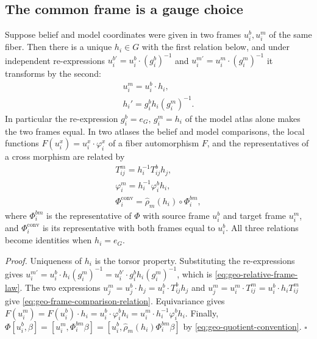 \subsection{The common frame is a gauge choice}
\label{sec:geo-diagonal}

Suppose belief and model coordinates were given in two frames $u_i^b,u_i^m$ of the same fiber. Then
there is a unique $h_i\in G$ with the first relation below, and under independent re-expressions
$u_i^{b\prime}=u_i^b\cdot(g_i^b)^{-1}$ and $u_i^{m\prime}=u_i^m\cdot(g_i^m)^{-1}$ it transforms by the
second:
\begin{gather}
u_i^m=u_i^b\cdot h_i,
\label{eq:geo-relative-frame}\\
h_i'=g_i^bh_i(g_i^m)^{-1}.
\label{eq:geo-relative-frame-law}
\end{gather}
In particular the re-expression $g_i^b=e_G$, $g_i^m=h_i$ of the model atlas alone makes the two
frames equal. In two atlases the belief and model comparisons, the local functions
$F(u_i^x)=u_i^x\cdot\varphi_i^x$ of a fiber automorphism $F$, and the representatives of a cross
morphism are related by
\begin{gather}
T_{ij}^m=h_i^{-1}T_{ij}^bh_j,
\label{eq:geo-frame-comparison-relation}\\
\varphi_i^m=h_i^{-1}\varphi_i^bh_i,
\label{eq:geo-diagonal-gauge-functions}\\
\Phi_i^{\mathrm{conv}}=\widehat\rho_m(h_i)\circ\Phi_i^{bm},
\label{eq:geo-map-bundle-frame-conversion}
\end{gather}
where $\Phi_i^{bm}$ is the representative of $\Phi$ with source frame $u_i^b$ and target frame
$u_i^m$, and $\Phi_i^{\mathrm{conv}}$ is its representative with both frames equal to $u_i^b$. All
three relations become identities when $h_i=e_G$. 

\noindent\emph{Proof.}
Uniqueness of $h_i$ is the torsor property. Substituting the re-expressions gives
$u_i^{m\prime}=u_i^b\cdot h_i(g_i^m)^{-1}=u_i^{b\prime}\cdot g_i^bh_i(g_i^m)^{-1}$, which is
\eqref{eq:geo-relative-frame-law}. The two expressions $u_j^m=u_j^b\cdot h_j=u_i^b\cdot T_{ij}^bh_j$
and $u_j^m=u_i^m\cdot T_{ij}^m=u_i^b\cdot h_iT_{ij}^m$ give
\eqref{eq:geo-frame-comparison-relation}. Equivariance gives
$F(u_i^m)=F(u_i^b)\cdot h_i=u_i^b\cdot\varphi_i^bh_i=u_i^m\cdot h_i^{-1}\varphi_i^bh_i$. Finally,
$\Phi[u_i^b,\beta]=[u_i^m,\Phi_i^{bm}\beta]=[u_i^b,\widehat\rho_m(h_i)\Phi_i^{bm}\beta]$ by
\eqref{eq:geo-quotient-convention}. \hfill$\square$

